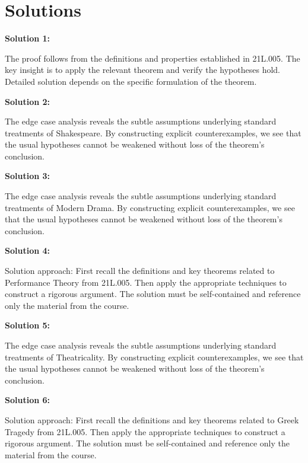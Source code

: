 \documentclass[12pt,a4paper]{exam}
\begin{document}
\newpage
\section*{Solutions}

\textbf{Solution 1:}

The proof follows from the definitions and properties established in 21L.005. The key insight is to apply the relevant theorem and verify the hypotheses hold. Detailed solution depends on the specific formulation of the theorem.

\vspace{0.5cm}

\textbf{Solution 2:}

The edge case analysis reveals the subtle assumptions underlying standard treatments of Shakespeare. By constructing explicit counterexamples, we see that the usual hypotheses cannot be weakened without loss of the theorem's conclusion.

\vspace{0.5cm}

\textbf{Solution 3:}

The edge case analysis reveals the subtle assumptions underlying standard treatments of Modern Drama. By constructing explicit counterexamples, we see that the usual hypotheses cannot be weakened without loss of the theorem's conclusion.

\vspace{0.5cm}

\textbf{Solution 4:}

Solution approach: First recall the definitions and key theorems related to Performance Theory from 21L.005. Then apply the appropriate techniques to construct a rigorous argument. The solution must be self-contained and reference only the material from the course.

\vspace{0.5cm}

\textbf{Solution 5:}

The edge case analysis reveals the subtle assumptions underlying standard treatments of Theatricality. By constructing explicit counterexamples, we see that the usual hypotheses cannot be weakened without loss of the theorem's conclusion.

\vspace{0.5cm}

\textbf{Solution 6:}

Solution approach: First recall the definitions and key theorems related to Greek Tragedy from 21L.005. Then apply the appropriate techniques to construct a rigorous argument. The solution must be self-contained and reference only the material from the course.
\end{document}
